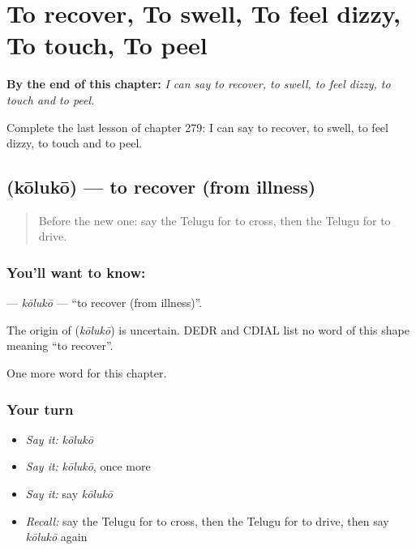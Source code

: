 
\chapter{To recover, To swell, To feel dizzy, To touch, To peel}
\label{ch:te-to-recover-to-swell-to-feel-dizzy-to-touch-to-peel}

\begin{chapteropening}
\textbf{By the end of this chapter:} \emph{I can say to recover, to swell, to feel dizzy, to touch and to peel.}

Complete the last lesson of chapter 279: I can say to recover, to swell, to feel dizzy, to touch and to peel.
\end{chapteropening}

\section[\texorpdfstring{\te{కోలుకో} (kōlukō)}{కోలుకో (kōlukō)}]{ (kōlukō) — to recover (from illness)}

\label{lesson:TE-C279-koluko}



\begin{quote}
Before the new one: say the Telugu for to cross, then the Telugu for to drive.
\end{quote}

\subsection*{You'll want to know: }
\textbf{} — \emph{kōlukō} — \textquotedblleft{}to recover (from illness)\textquotedblright{}.

\begin{cousinweb}
The origin of \textbf{} (\emph{kōlukō}) is uncertain. DEDR and CDIAL list no word of this shape meaning \textquotedblleft{}to recover\textquotedblright{}.
\end{cousinweb}

\begin{grammarlens}[title={What you've built}]
One more word for this chapter.
\end{grammarlens}

\subsection*{Your turn}
\begin{itemize}
\raggedright
  \item \emph{Say it:} \emph{kōlukō}
  \item \emph{Say it:} \emph{kōlukō}, once more
  \item \emph{Say it:} say \emph{kōlukō}
  \item \emph{Recall:} say the Telugu for to cross, then the Telugu for to drive, then say \emph{kōlukō} again
\end{itemize}

